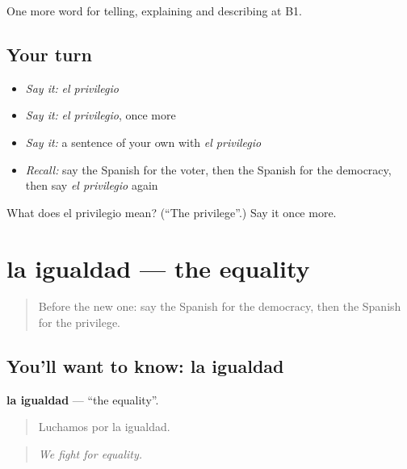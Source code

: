 \begin{grammarlens}[title={What you've built}]
One more word for telling, explaining and describing at B1.
\end{grammarlens}

\subsection*{Your turn}
\begin{itemize}
\raggedright
  \item \emph{Say it:} \emph{el privilegio}
  \item \emph{Say it:} \emph{el privilegio}, once more
  \item \emph{Say it:} a sentence of your own with \emph{el privilegio}
  \item \emph{Recall:} say the Spanish for the voter, then the Spanish for the democracy, then say \emph{el privilegio} again
\end{itemize}

\begin{tcolorbox}[breakable,colback=teal!4,colframe=teal!35!black,title={Before you move on}]
What does el privilegio mean? (\textquotedblleft{}The privilege\textquotedblright{}.) Say it once more.
\end{tcolorbox}
\section[la igualdad]{la igualdad — the equality}

\label{lesson:ES-C603-igualdad}



\begin{quote}
Before the new one: say the Spanish for the democracy, then the Spanish for the privilege.
\end{quote}

\subsection*{You'll want to know: la igualdad}
\textbf{la igualdad} — \textquotedblleft{}the equality\textquotedblright{}.

\begin{quote}
Luchamos por la igualdad.
\end{quote}

\begin{quote}
\emph{We fight for equality.}
\end{quote}

